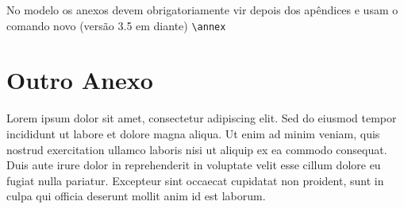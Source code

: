 \documentclass[dsc,setavermelha]{ufrj}
\theoremstyle{plain}
\theoremstyle{definition}
\theoremstyle{remark}
\begin{document}
No modelo \CoppeTeX{} os anexos devem obrigatoriamente vir depois dos apêndices e usam o comando novo (versão 3.5 em diante) \verb|\annex|

\chapter{Outro Anexo}

Lorem ipsum dolor sit amet, consectetur adipiscing elit. Sed do eiusmod tempor incididunt ut labore et dolore magna aliqua. Ut enim ad minim veniam, quis nostrud exercitation ullamco laboris nisi ut aliquip ex ea commodo consequat. Duis aute irure dolor in reprehenderit in voluptate velit esse cillum dolore eu fugiat nulla pariatur. Excepteur sint occaecat cupidatat non proident, sunt in culpa qui officia deserunt mollit anim id est laborum.

\renewcommand{\indexname}{Índice de Assuntos}
\printindex

\ufrjfinalpage%
\end{document}
